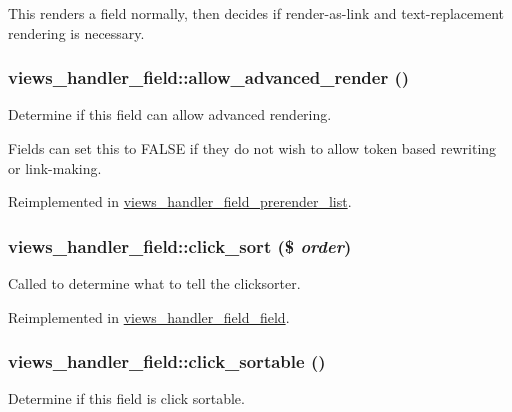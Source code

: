 This renders a field normally, then decides if render-\/as-\/link and text-\/replacement rendering is necessary. \hypertarget{classviews__handler__field_acdeb45612be43c2d58814726b35e55aa}{
\subsubsection[{allow\_\-advanced\_\-render}]{\setlength{\rightskip}{0pt plus 5cm}views\_\-handler\_\-field::allow\_\-advanced\_\-render ()}}
\label{classviews__handler__field_acdeb45612be43c2d58814726b35e55aa}
Determine if this field can allow advanced rendering.

Fields can set this to FALSE if they do not wish to allow token based rewriting or link-\/making. 

Reimplemented in \hyperlink{classviews__handler__field__prerender__list_a341b000d2b0e13c3819e47165ca33ec9}{views\_\-handler\_\-field\_\-prerender\_\-list}.\hypertarget{classviews__handler__field_a1c8cabe835ba05ed045c8f6eec6a36b8}{
\subsubsection[{click\_\-sort}]{\setlength{\rightskip}{0pt plus 5cm}views\_\-handler\_\-field::click\_\-sort (\$ {\em order})}}
\label{classviews__handler__field_a1c8cabe835ba05ed045c8f6eec6a36b8}
Called to determine what to tell the clicksorter. 

Reimplemented in \hyperlink{classviews__handler__field__field_aaded59c09fb313c01398a7652d92ae0d}{views\_\-handler\_\-field\_\-field}.\hypertarget{classviews__handler__field_a22ef16d2b34823a3d12f273d34278b00}{
\subsubsection[{click\_\-sortable}]{\setlength{\rightskip}{0pt plus 5cm}views\_\-handler\_\-field::click\_\-sortable ()}}
\label{classviews__handler__field_a22ef16d2b34823a3d12f273d34278b00}
Determine if this field is click sortable. 

